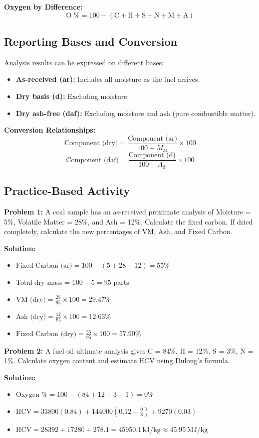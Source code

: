 \documentclass[12pt,a4paper]{article}
\begin{document}
\textbf{Oxygen by Difference:}
\[ \text{O \%} = 100 - (\text{C} + \text{H} + \text{S} + \text{N} + \text{M} + \text{A}) \]

\subsection{Reporting Bases and Conversion}
Analysis results can be expressed on different bases:
\begin{itemize}
    \item \textbf{As-received (ar):} Includes all moisture as the fuel arrives.
    \item \textbf{Dry basis (d):} Excluding moisture.
    \item \textbf{Dry ash-free (daf):} Excluding moisture and ash (pure combustible matter).
\end{itemize}

\textbf{Conversion Relationships:}
\[ \text{Component (dry)} = \frac{\text{Component (ar)}}{100 - M_{\mathrm{ar}}} \times 100 \]
\[ \text{Component (daf)} = \frac{\text{Component (d)}}{100 - A_{\mathrm{d}}} \times 100 \]

\subsection{Practice-Based Activity}

\begin{example}
\textbf{Problem 1:} A coal sample has an as-received proximate analysis of Moisture = 5\%, Volatile Matter = 28\%, and Ash = 12\%. Calculate the fixed carbon. If dried completely, calculate the new percentages of VM, Ash, and Fixed Carbon.

\textbf{Solution:}
\begin{itemize}
    \item $\text{Fixed Carbon (ar)} = 100 - (5 + 28 + 12) = 55\%$
    \item Total dry mass = $100 - 5 = 95$ parts
    \item $\text{VM (dry)} = \frac{28}{95} \times 100 = 29.47\%$
    \item $\text{Ash (dry)} = \frac{12}{95} \times 100 = 12.63\%$
    \item $\text{Fixed Carbon (dry)} = \frac{55}{95} \times 100 = 57.90\%$
\end{itemize}
\end{example}

\begin{example}
\textbf{Problem 2:} A fuel oil ultimate analysis gives C = 84\%, H = 12\%, S = 3\%, N = 1\%. Calculate oxygen content and estimate HCV using Dulong's formula.

\textbf{Solution:}
\begin{itemize}
    \item $\text{Oxygen \%} = 100 - (84 + 12 + 3 + 1) = 0\%$
    \item $\mathrm{HCV} = 33800(0.84) + 144000\left(0.12 - \frac{0}{8}\right) + 9270(0.03)$
    \item $\mathrm{HCV} = 28392 + 17280 + 278.1 = 45950.1\,\text{kJ/kg} \approx 45.95\,\text{MJ/kg}$
\end{itemize}
\end{example}
\end{document}
